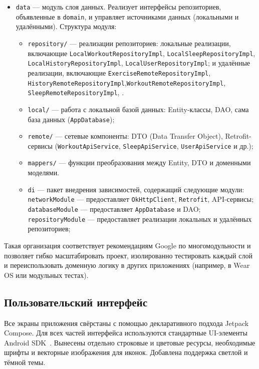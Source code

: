 \begin{itemize}
    \item \texttt{data} — модуль слоя данных. Реализует интерфейсы репозиториев, объявленные в \texttt{domain}, и управляет источниками данных (локальными и удалёнными). Структура модуля:
        \begin{itemize}
            \item \texttt{repository/} — реализации репозиториев: локальные реализации, включающие \texttt{LocalWorkoutRepositoryImpl}, \texttt{LocalSleepRepositoryImpl}, \texttt{LocalHistoryRepositoryImpl}, \texttt{LocalUserRepositoryImpl}; и удалённые реализации, включающие \texttt{ExerciseRemoteRepositoryImpl}, \texttt{HistoryRemoteRepositoryImpl},\texttt{WorkoutRemoteRepositoryImpl}, \texttt{SleepRemoteRepositoryImpl}, .
            \item \texttt{local/} — работа с локальной базой данных: Entity-классы, DAO, сама база данных (\texttt{AppDatabase});
            \item \texttt{remote/} — сетевые компоненты: DTO (Data Transfer Object), Retrofit-сервисы (\texttt{WorkoutApiService}, \texttt{SleepApiService}, \texttt{UserApiService} и др.);
            \item \texttt{mappers/} — функции преобразования между Entity, DTO и доменными моделями.
            \item \texttt{di} — пакет внедрения зависимостей, содержащий следующие модули:
            \texttt{networkModule} — предоставляет \texttt{OkHttpClient}, \texttt{Retrofit}, API-сервисы;
            \texttt{databaseModule} — предоставляет \texttt{AppDatabase} и DAO;
            \texttt{repositoryModule} — предоставляет реализации локальных и удалённых репозиториев;
        \end{itemize}
\end{itemize}

Такая организация соответствует рекомендациям Google по многомодульности и позволяет гибко масштабировать проект, изолированно тестировать каждый слой и переиспользовать доменную логику в других приложениях (например, в Wear OS или модульных тестах).

\subsection{Пользовательский интерфейс}

Все экраны приложения свёрстаны с помощью декларативного подхода Jetpack Compose. Для всех частей интерфейса используются стандартные UI-элементы Android SDK~\cite{refh}. Вынесены отдельно строковые и цветовые ресурсы, необходимые шрифты и векторные изображения для иконок. Добавлена поддержка светлой и тёмной темы.

